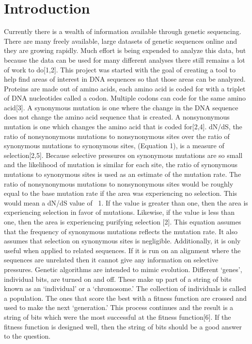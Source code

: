 \documentclass{article}
\begin{document}
\section{Introduction}
	Currently there is a wealth of information available through genetic sequencing.  There are many freely available, large datasets of genetic sequences online and they are growing rapidly.  Much effort is being expended to analyze this data, but because the data can be used for many different analyses there still remains a lot of work to do[1,2].  This project was started with the goal of creating a tool to help find areas of interest in DNA sequences so that those areas can be analyzed.
Proteins are made out of amino acids, each amino acid is coded for with a triplet of DNA nucleotides called a codon.  Multiple codons can code for the same amino acid[3].  A synonymous mutation is one where the change in the DNA sequence does not change the amino acid sequence that is created.  A nonsynonymous mutation is one which changes the amino acid that is coded for[2,4].  dN/dS, the ratio of nonsynonymous mutations to nonsynonymous sites over the ratio of synonymous mutations to synonymous sites, (Equation 1), is a measure of selection[2,5].  Because selective pressures on synonymous mutations are so small and the likelihood of mutation is similar for each site, the ratio of synonymous mutations to synonymous sites is used as an estimate of the mutation rate.  The ratio of nonsynonymous mutations to nonsynonymous sites would be roughly equal to the base mutation rate if the area was experiencing no selection.  This would mean a dN/dS value of ~1.  If the value is greater than one, then the area is experiencing selection in favor of mutations.  Likewise, if the value is less than one, then the area is experiencing purifying selection [2]. This equation assumes that the frequency of synonymous mutations reflects the mutation rate. It also assumes that selection on synonymous sites is negligible. Additionally, it is only useful when applied to related sequences.  If it is run on an alignment where the sequences are unrelated then it cannot give any information on selective pressures. 
        	Genetic algorithms are intended to mimic evolution.  Different ‘genes’, individual bits, are turned on and off.  These make up part of a string of bits known as an ‘individual’ or a ‘chromosome.’  The collection of individuals is called a population. The ones that score the best with a fitness function are crossed and used to make the next ‘generation.’  This process continues and the result is a string of bits which were the most successful at the fitness function[6].  If the fitness function is designed well, then the string of bits should be a good answer to the question.
\end{document}
